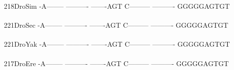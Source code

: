 \documentclass[11pt,twoside,reqno,a4paper]{article}
\begin{document}
{218\hspace*{1\charwidth}DroSim	-A--------	----------	-------AGT	C---------	----------	GGGGGAGTGT	\\
\hspace*{4\charwidth}\hspace*{7\charwidth}\hspace*{1\charwidth}\hspace*{1\charwidth}\hspace*{1\charwidth}\hspace*{1\charwidth}\hspace*{1\charwidth}\hspace*{1\charwidth}\\
221\hspace*{1\charwidth}DroSec	-A--------	----------	-------AGT	C---------	----------	GGGGGAGTGT	\\
\hspace*{4\charwidth}\hspace*{7\charwidth}\hspace*{1\charwidth}\hspace*{1\charwidth}\hspace*{1\charwidth}\hspace*{1\charwidth}\hspace*{1\charwidth}\hspace*{1\charwidth}\\
221\hspace*{1\charwidth}DroYak	-A--------	----------	-------AGT	C---------	----------	GGGGGAGTGT	\\
\hspace*{4\charwidth}\hspace*{7\charwidth}\hspace*{1\charwidth}\hspace*{1\charwidth}\hspace*{1\charwidth}\hspace*{1\charwidth}\hspace*{1\charwidth}\hspace*{1\charwidth}\\
217\hspace*{1\charwidth}DroEre	-A--------	----------	-------AGT	C---------	----------	GGGGGAGTGT	\\
\hspace*{4\charwidth}\hspace*{7\charwidth}\hspace*{1\charwidth}\hspace*{1\charwidth}\hspace*{1\charwidth}\hspace*{1\charwidth}\hspace*{1\charwidth}\hspace*{1\charwidth}\\
}
\end{document}
